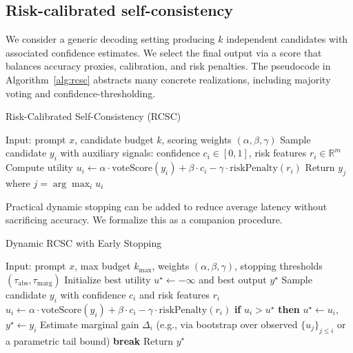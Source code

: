\documentclass[10pt]{article}
\begin{document}
\subsection{Risk-calibrated self-consistency}
We consider a generic decoding setting producing $k$ independent candidates with associated confidence estimates. We select the final output via a score that balances accuracy proxies, calibration, and risk penalties. The pseudocode in Algorithm~\ref{alg:rcsc} abstracts many concrete realizations, including majority voting and confidence-thresholding.

\begin{algorithm}[ht]
\caption{Risk-Calibrated Self-Consistency (RCSC)}
\label{alg:rcsc}
\begin{algorithmic}[1]
\STATE Input: prompt $x$, candidate budget $k$, scoring weights $(\alpha,\beta,\gamma)$
  \STATE Sample candidate $y_i$ with auxiliary signals: confidence $c_i \in [0,1]$, risk features $r_i \in \mathbb{R}^m$
  \STATE Compute utility $u_i \leftarrow \alpha \cdot \mathrm{voteScore}(y_i) + \beta \cdot c_i - \gamma \cdot \mathrm{riskPenalty}(r_i)$
\ENDFOR
\STATE Return $y_j$ where $j = \arg\max_i u_i$
\end{algorithmic}
\end{algorithm}

\noindent Practical dynamic stopping can be added to reduce average latency without sacrificing accuracy. We formalize this as a companion procedure.

\begin{algorithm}[ht]
\caption{Dynamic RCSC with Early Stopping}
\label{alg:dynamic_rcsc}
\begin{algorithmic}[1]
\STATE Input: prompt $x$, max budget $k_{\max}$, weights $(\alpha,\beta,\gamma)$, stopping thresholds $(\tau_{\mathrm{abs}}, \tau_{\mathrm{marg}})$
\STATE Initialize best utility $u^\star \leftarrow -\infty$ and best output $y^\star$
  \STATE Sample candidate $y_i$ with confidence $c_i$ and risk features $r_i$
  \STATE $u_i \leftarrow \alpha \cdot \mathrm{voteScore}(y_i) + \beta \cdot c_i - \gamma \cdot \mathrm{riskPenalty}(r_i)$
  \STATE \textbf{if} $u_i > u^\star$ \textbf{then} $u^\star \leftarrow u_i$, $y^\star \leftarrow y_i$
  \STATE Estimate marginal gain $\Delta_i$ (e.g., via bootstrap over observed $\{u_j\}_{j\le i}$ or a parametric tail bound)
    \STATE \textbf{break}
  \ENDIF
\ENDFOR
\STATE Return $y^\star$
\end{algorithmic}
\end{algorithm}
\end{document}
